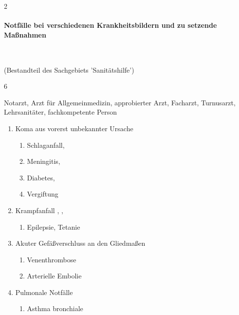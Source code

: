 \begin{WidePar}
\begin{multicols}{2}
\paragraph{Notfälle bei verschiedenen Krankheitsbildern  und zu setzende Maßnahmen}~
  
  (Bestandteil des Sachgebiets 'Sanitätshilfe')
  
  \begin{inparadesc}
    \item[Stundenanzahl:]  6
    \item[Lehrkraft:]  Notarzt, Arzt für Allgemeinmedizin, approbierter Arzt,
    Facharzt, Turnusarzt, Lehrsanitäter, fachkompetente Person
  \end{inparadesc}
  \begin{enumerate}\item
    Koma aus vorerst unbekannter Ursache
    \begin{enumerate}
      \item      Schlaganfall, \dotfill {}
      \item      Meningitis, \dotfill  {}
      \item      Diabetes, \dotfill  {}
      \item      Vergiftung \dotfill  {}
    \end{enumerate}
    \item
    Krampfanfall  \dotfill {},
    ,
     \\
    \begin{enumerate}
      \item     Epilepsie, Tetanie \dotfill {}
    \end{enumerate}
    \item Akuter Gefäßverschluss an den Gliedmaßen
    \begin{enumerate}
      \item      Venenthrombose \dotfill {}
      \item      Arterielle Embolie \dotfill  {}
    \end{enumerate}
    \item Pulmonale Notfälle
    \begin{enumerate}
      \item      Asthma bronchiale \dotfill {}

\end{enumerate}
\end{enumerate}
\end{multicols}
\end{WidePar}
